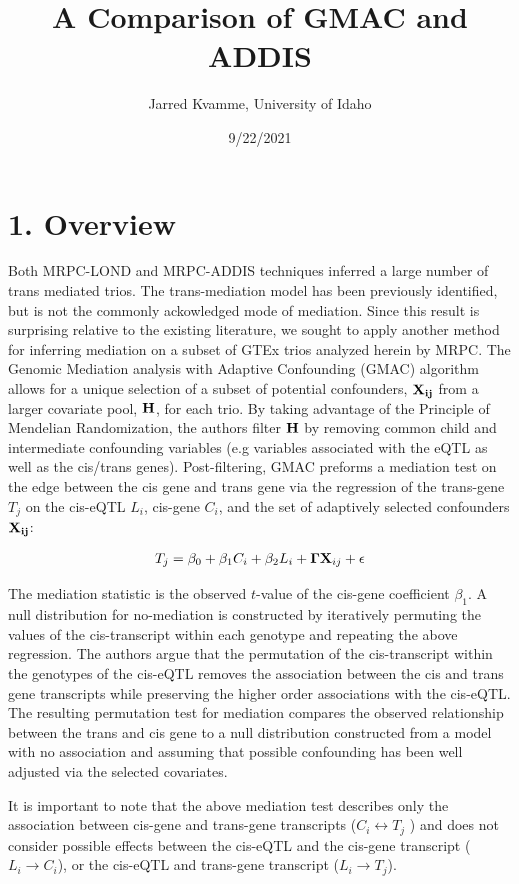 \documentclass[
]{article}
\title{A Comparison of GMAC and ADDIS}
\author{Jarred Kvamme, University of Idaho}
\date{9/22/2021}
\begin{document}
\maketitle

\section*{1. Overview}

Both MRPC-LOND and MRPC-ADDIS techniques inferred a large number of
trans mediated trios. The trans-mediation model has been previously
identified, but is not the commonly ackowledged mode of mediation. Since
this result is surprising relative to the existing literature, we sought
to apply another method for inferring mediation on a subset of GTEx
trios analyzed herein by MRPC. The Genomic Mediation analysis with
Adaptive Confounding (GMAC) algorithm allows for a unique selection of a
subset of potential confounders, \({\bf X_{ij}}\) from a larger
covariate pool, \({\bf H}\), for each trio. By taking advantage of the
Principle of Mendelian Randomization, the authors filter \({\bf H}\) by
removing common child and intermediate confounding variables (e.g
variables associated with the eQTL as well as the cis/trans genes).
Post-filtering, GMAC preforms a mediation test on the edge between the
cis gene and trans gene via the regression of the trans-gene \(T_j\) on
the cis-eQTL \(L_i\), cis-gene \(C_i\), and the set of adaptively
selected confounders \({\bf X_{ij}}\):

\begin{eqnarray} T_j = \beta_0 + \beta_1 C_i + \beta_2 L_i + {\bf \Gamma} {\bf X}_{ij} + \epsilon \end{eqnarray}

The mediation statistic is the observed \(t\)-value of the cis-gene
coefficient \(\beta_1\). A null distribution for no-mediation is
constructed by iteratively permuting the values of the cis-transcript
within each genotype and repeating the above regression. The authors
argue that the permutation of the cis-transcript within the genotypes of
the cis-eQTL removes the association between the cis and trans gene
transcripts while preserving the higher order associations with the
cis-eQTL. The resulting permutation test for mediation compares the
observed relationship between the trans and cis gene to a null
distribution constructed from a model with no association and assuming
that possible confounding has been well adjusted via the selected
covariates.

It is important to note that the above mediation test describes only the
association between cis-gene and trans-gene transcripts
(\(C_i \leftrightarrow T_j\) ) and does not consider possible effects
between the cis-eQTL and the cis-gene transcript
(\(L_i \rightarrow C_i\)), or the cis-eQTL and trans-gene transcript
(\(L_i \rightarrow T_j\)).
\end{document}
